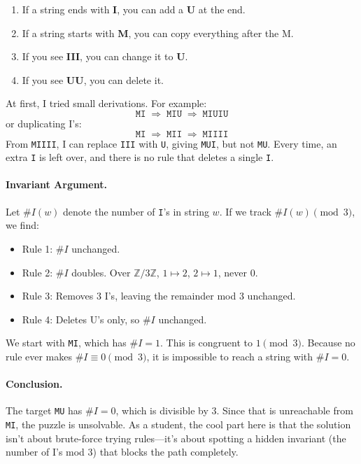 \documentclass{article}
\theoremstyle{theorem}
\theoremstyle{definition}
\theoremstyle{remark}
\begin{document}
\begin{enumerate}
    \item If a string ends with \textbf{I}, you can add a \textbf{U} at the end.  
    \item If a string starts with \textbf{M}, you can copy everything after the M.  
    \item If you see \textbf{III}, you can change it to \textbf{U}.  
    \item If you see \textbf{UU}, you can delete it.  
\end{enumerate}

At first, I tried small derivations. For example:
\[
\texttt{MI} \;\Rightarrow\; \texttt{MIU} \;\Rightarrow\; \texttt{MIUIU}
\]
or duplicating I’s:
\[
\texttt{MI} \;\Rightarrow\; \texttt{MII} \;\Rightarrow\; \texttt{MIIII}
\]
From \texttt{MIIII}, I can replace \texttt{III} with \texttt{U}, giving \texttt{MUI}, but not \texttt{MU}. Every time, an extra \texttt{I} is left over, and there is no rule that deletes a single \texttt{I}.

\paragraph{Invariant Argument.}  
Let $\#I(w)$ denote the number of \texttt{I}'s in string $w$. If we track $\#I(w) \pmod 3$, we find:
\begin{itemize}
    \item Rule 1: $\#I$ unchanged.  
    \item Rule 2: $\#I$ doubles. Over $\mathbb{Z}/3\mathbb{Z}$, $1 \mapsto 2$, $2 \mapsto 1$, never $0$.  
    \item Rule 3: Removes $3$ I’s, leaving the remainder mod 3 unchanged.  
    \item Rule 4: Deletes U’s only, so $\#I$ unchanged.  
\end{itemize}

We start with \texttt{MI}, which has $\#I=1$. This is congruent to $1 \pmod 3$. Because no rule ever makes $\#I \equiv 0 \pmod 3$, it is impossible to reach a string with $\#I=0$.

\paragraph{Conclusion.}  
The target \texttt{MU} has $\#I=0$, which is divisible by $3$. Since that is unreachable from \texttt{MI}, the puzzle is unsolvable. As a student, the cool part here is that the solution isn’t about brute-force trying rules—it’s about spotting a hidden invariant (the number of I’s mod 3) that blocks the path completely.
\end{document}
